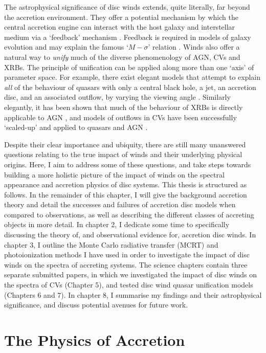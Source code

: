 The astrophysical significance of disc winds extends, quite literally, 
far beyond the accretion environment. They offer a potential mechanism by which the central
accretion engine can interact with the host galaxy and interstellar medium 
via a `feedback' mechanism \citep{king2003,fabian2012}. 
Feedback is required in models of galaxy evolution \citep{springel2005}
and may explain the famous `$M-\sigma$' relation \citep{silkrees1998,haring2004}.
Winds also offer a natural way to {\em unify} much
of the diverse phenomenology of AGN, CVs and XRBs. The principle of unification
can be applied along more than one `axis' of parameter space. For example, 
there exist elegant models that attempt to explain {\em all}
of the behaviour of quasars with only a central black hole, a jet, an accretion disc,
and an associated outflow, by varying the viewing angle \citep{elvis2000}.
Similarly elegantly, it has been shown that much of the behaviour of XRBs
is directly applicable to AGN \citep{mchardy2006}, 
and models of outflows in CVs have been successfully `scaled-up'
and applied to quasars and AGN \citep[e.g.][]{higginbottom2013}.

Despite their clear importance and ubiquity, there are still
many unanswered questions relating to the true impact of winds and their underlying
physical origins. Here, I aim to address some of these questions, and 
take steps towards building a more holistic picture of the impact
of winds on the spectral appearance and accretion physics of disc systems.
This thesis is structured as follows. In the remainder of this chapter, 
I will give the background accretion theory 
and detail the successes and failures of accretion disc models when compared to observations,
as well as describing the different classes of accreting objects in more detail. 
In chapter 2, I dedicate some time to specifically discussing the theory of,
and observational evidence for, accretion disc winds. In chapter 3, I outline 
the Monte Carlo radiative transfer (MCRT) and photoionization
methods I have used in order to investigate the impact of disc 
winds on the spectra of accreting systems. The science chapters
contain three separate submitted papers, in which we investigated the impact
of disc winds on the spectra of CVs (Chapter 5), and tested disc wind
quasar unification models (Chapters 6 and 7).
In chapter 8, I summarise my findings and their astrophysical significance, 
and discuss potential avenues for future work.


\section{The Physics of Accretion}

